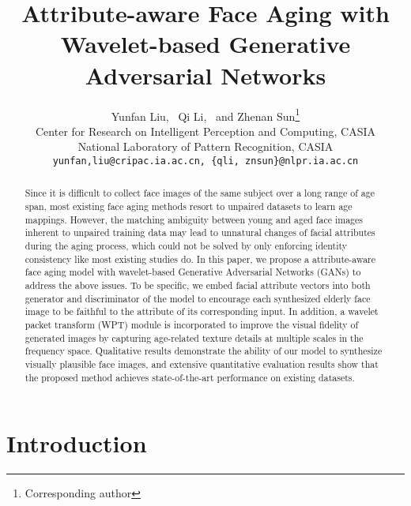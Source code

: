 \documentclass[10pt,twocolumn,letterpaper]{article}
\begin{document}
\title{Attribute-aware Face Aging with Wavelet-based Generative Adversarial Networks}

\author{Yunfan Liu, \  Qi Li,  \ and Zhenan Sun\thanks{Corresponding author}\\
Center for Research on Intelligent Perception and Computing, CASIA\\
National Laboratory of Pattern Recognition, CASIA\\
{\tt\small yunfan,liu@cripac.ia.ac.cn, \{qli, znsun\}@nlpr.ia.ac.cn}
}

\maketitle
\begin{abstract}
Since it is difficult to collect face images of the same subject over a long range of age span, most existing face aging methods resort to unpaired datasets to learn age mappings. %
However, the matching ambiguity between young and aged face images inherent to unpaired training data may lead to unnatural changes of facial attributes during the aging process, which could not be solved by only enforcing identity consistency like most existing studies do.
In this paper, we propose a attribute-aware face aging model with wavelet-based Generative Adversarial Networks (GANs) to address the above issues.
To be specific, we embed facial attribute vectors into both generator and discriminator of the model to encourage each synthesized elderly face image to be faithful to the attribute of its corresponding input.
In addition, a wavelet packet transform (WPT) module is incorporated to improve the visual fidelity of generated images by capturing age-related texture details at multiple scales in the frequency space. 
Qualitative results demonstrate the ability of our model to synthesize visually plausible face images, and extensive quantitative evaluation results show that the proposed method achieves state-of-the-art performance on existing datasets.
\end{abstract}

\section{Introduction}
\end{document}
